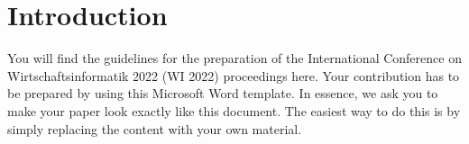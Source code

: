 \section{Introduction}
\label{sec:introduction}

You will find the guidelines for the preparation of the International Conference on Wirtschaftsinformatik 2022 (WI 2022) proceedings here. 
Your contribution has to be prepared by using this Microsoft Word template. 
In essence, we ask you to make your paper look exactly like this document. 
The easiest way to do this is by simply replacing the content with your own material.